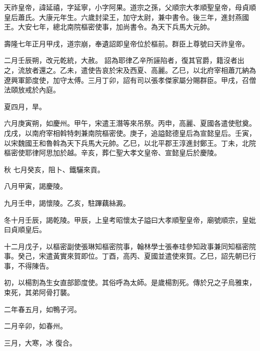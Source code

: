 
\begin{pinyinscope}

 天祚皇帝，諱延禧，字延寧，小字阿果。道宗之孫，父順宗大孝順聖皇帝，母貞順皇后蕭氏。大康元年生。六歲封梁王，加守太尉，兼中書令。後三年，進封燕國王。大安七年，總北南院樞密使事，加尚書令。為天下兵馬大元帥。



 壽隆七年正月甲戌，道宗崩，奉遺詔即皇帝位於樞前。群臣上尊號曰天祚皇帝。



 二月壬辰朔，改元乾統，大赦。
 詔為耶律乙辛所誣陷者，復其官爵，籍沒者出之，流放者還之。乙未，遣使告哀於宋及西夏、高麗。乙巳，以北府宰相蕭兀納為遼興軍節度使，加守太傅。三月丁卯，詔有司以張孝傑家屬分賜群臣。甲戌，召僧法頤放戒於內庭。



 夏四月，旱。



 六月庚寅朔，如慶州。甲午，宋遣王潛等來吊祭。丙申，高麗、夏國各遣使慰奠。戊戌，以南府宰相斡特刺兼南院樞密使。庚子，追謚懿德皇后為宣懿皇后。壬寅，以宋魏國王和魯斡為天下兵馬大元帥。乙巳，以北平郡王淳進封鄭王。丁未，北院樞密使耶律阿思加於越。辛亥，葬仁聖大孝文皇帝、宣懿皇后於慶陵。



 秋
 七月癸亥，阻卜、鐵驪來貢。



 八月甲寅，謁慶陵。



 九月壬申，謁懷陵。乙亥，駐蹕藕絲澱。



 冬十月壬辰，謁乾陵。甲辰，上皇考昭懷太子謚曰大孝順聖皇帝，廟號順宗，皇妣曰貞順皇后。



 十二月戊子，以樞密副使張琳知樞密院事，翰林學士張奉珪參知政事兼同知樞密院事。癸己，宋遣黃實來賀即位。丁酉，高丙、夏國並遣使來賀。乙巳，詔先朝已行事，不得陳告。



 初，以楊割為生女直部節度使。其俗呼為太師。是歲楊割死。傳於兄之子烏雅束，束死，其弟阿骨打襲。



 二年春五月，如鴨子河。



 二月辛卯，如春州。



 三月，大寒，冰
 復合。




\end{pinyinscope}
